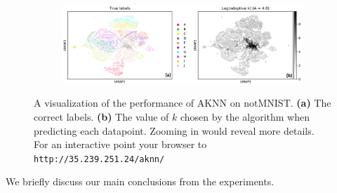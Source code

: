 \documentclass{article}
\newcommand{\algname}{\textsc{AKNN}}
\newcommand{\comment}[3]{{\color{#1} {\bf #2 :} #3}}
\newcommand{\akshay}[1]{\comment{blue}{Akshay}{#1}}
\begin{document}


\begin{figure}[th]
    \centering
    \begin{subfigure}{0.95\textwidth}
    \centering
        \includegraphics[width=\linewidth]{figs/notMNIST/umapnotMNIST_combined.png}
    \end{subfigure}
    \caption{ A visualization of the performance of AKNN on notMNIST.
      {\bf (a)} The correct labels. {\bf (b)} The value of $k$ chosen
      by the algorithm when predicting each datapoint. Zooming in
      would reveal more details. For an interactive point your browser
    to \texttt{http://35.239.251.24/aknn/}}
  \label{fig:varyingadak}
\end{figure}


We briefly discuss our main conclusions from the experiments.
\end{document}
